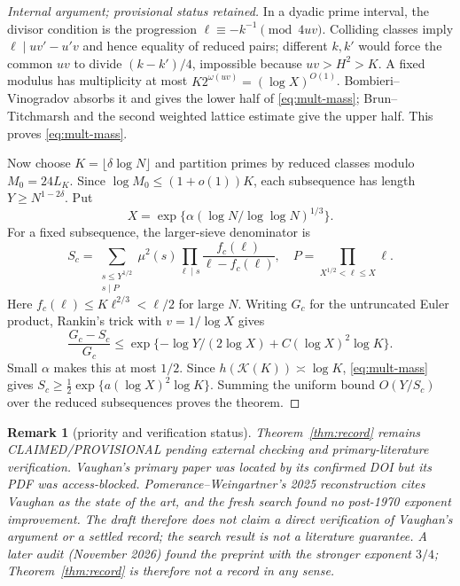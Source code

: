 \documentclass[10pt,reqno]{amsart}
\newtheorem{remark}[theorem]{Remark}
\theoremstyle{definition}
\newcommand{\1}{\mathbf 1}
\begin{document}
\begin{proof}[Internal argument; provisional status retained]
In a dyadic prime interval, the divisor condition is the progression
$\ell\equiv-k^{-1}\pmod{4uv}$.  Colliding classes imply
$\ell\mid uv'-u'v$ and hence equality of reduced pairs; different $k,k'$ would force the common $uv$ to divide $(k-k')/4$, impossible because $uv>H^2>K$.  A fixed modulus has multiplicity at most
$K2^{\omega(uv)}=(\log X)^{O(1)}$.  Bombieri--Vinogradov absorbs it and gives the lower half of \eqref{eq:mult-mass}; Brun--Titchmarsh and the second weighted lattice estimate give the upper half.  This proves \eqref{eq:mult-mass}.

Now choose $K=\lfloor\delta\log N\rfloor$ and partition primes by reduced classes modulo $M_0=24L_K$.  Since $\log M_0\leq(1+o(1))K$, each subsequence has length $Y\geq N^{1-2\delta}$.  Put
\[
 X=\exp\{\alpha(\log N/\log\log N)^{1/3}\}.
\]
For a fixed subsequence, the larger-sieve denominator is
\[
 S_c=\sum_{\substack{s\leq Y^{1/2}\\s\mid P}}\mu^2(s)
 \prod_{\ell\mid s}\frac{f_c(\ell)}{\ell-f_c(\ell)},
 \quad P=\prod_{X^{1/2}<\ell\leq X}\ell.
\]
Here $f_c(\ell)\leq K\ell^{2/3}<\ell/2$ for large $N$.  Writing $G_c$ for the untruncated Euler product, Rankin's trick with $v=1/\log X$ gives
\[
 \frac{G_c-S_c}{G_c}
 \leq\exp\{-\log Y/(2\log X)+C(\log X)^2\log K\}.
\]
Small $\alpha$ makes this at most $1/2$.  Since
$h(\mathcal K(K))\asymp\log K$, \eqref{eq:mult-mass} gives
$S_c\geq\tfrac12\exp\{a(\log X)^2\log K\}$.  Summing the uniform bound $O(Y/S_c)$ over the reduced subsequences proves the theorem.
\end{proof}

\begin{remark}[priority and verification status]\label{rem:priority}
Theorem~\ref{thm:record} remains \textup{CLAIMED}/\allowbreak\textup{PROVISIONAL} pending external checking and primary-literature verification.  Vaughan's primary paper \cite{Vaughan} was located by its confirmed DOI but its PDF was access-blocked.  Pomerance--Weingartner's 2025 reconstruction \cite[\S4]{PomeranceWeingartner} cites Vaughan as the state of the art, and the fresh search found no post-1970 exponent improvement.  The draft therefore does not claim a direct verification of Vaughan's argument or a settled record; the search result is not a literature guarantee.  A later audit (November 2026) found the preprint \cite{KRK} with the stronger exponent $3/4$; Theorem~\ref{thm:record} is therefore not a record in any sense.
\end{remark}
\end{document}
